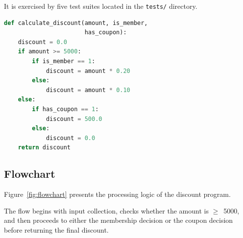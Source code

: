 \documentclass[conference]{IEEEtran}
\begin{document}
It is exercised by five test suites located in the \texttt{tests/} directory.



\begin{lstlisting}[language=Python,caption={Python implementation of the discount calculation},label={lst:discount_py}]
def calculate_discount(amount, is_member,
                       has_coupon):
    discount = 0.0
    if amount >= 5000:
        if is_member == 1:
            discount = amount * 0.20
        else:
            discount = amount * 0.10
    else:
        if has_coupon == 1:
            discount = 500.0
        else:
            discount = 0.0
    return discount
\end{lstlisting}



\subsection{Flowchart}

Figure~\ref{fig:flowchart} presents the processing logic of the discount program.

The flow begins with input collection, checks whether the amount is $\geq$~5000, and then proceeds to either the membership decision or the coupon decision before returning the final discount.
\end{document}
